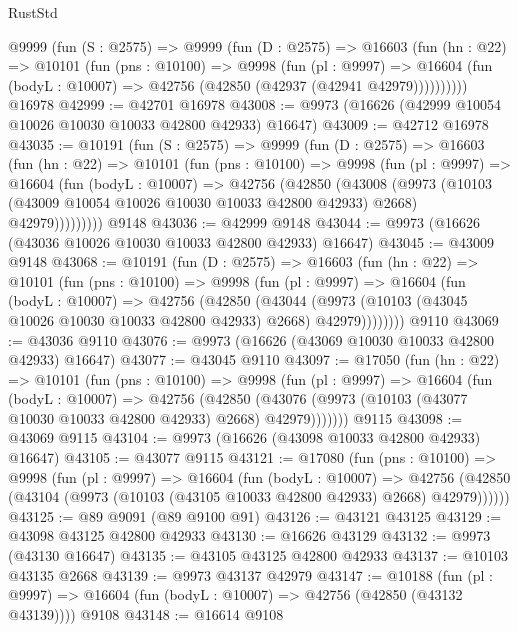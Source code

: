 \begin{lexlean}{RustStd}
\begin{coremodule}
    @9999
      (fun (S : @2575) =>
      @9999
        (fun (D : @2575) =>
        @16603
          (fun (hn : @22) =>
          @10101
            (fun (pns : @10100) =>
            @9998
              (fun (pl : @9997) =>
              @16604 (fun (bodyL : @10007) => @42756 (@42850 (@42937 (@42941 @42979))))))))))
    @16978
@42999 := @42701 @16978
@43008 := @9973 (@16626 (@42999 @10054 @10026 @10030 @10033 @42800 @42933) @16647)
@43009 := @42712 @16978
@43035 := @10191
    (fun (S : @2575) =>
    @9999
      (fun (D : @2575) =>
      @16603
        (fun (hn : @22) =>
        @10101
          (fun (pns : @10100) =>
          @9998
            (fun (pl : @9997) =>
            @16604
              (fun (bodyL : @10007) =>
              @42756
                (@42850
                  (@43008
                    (@9973
                      (@10103 (@43009 @10054 @10026 @10030 @10033 @42800 @42933) @2668)
                      @42979)))))))))
    @9148
@43036 := @42999 @9148
@43044 := @9973 (@16626 (@43036 @10026 @10030 @10033 @42800 @42933) @16647)
@43045 := @43009 @9148
@43068 := @10191
    (fun (D : @2575) =>
    @16603
      (fun (hn : @22) =>
      @10101
        (fun (pns : @10100) =>
        @9998
          (fun (pl : @9997) =>
          @16604
            (fun (bodyL : @10007) =>
            @42756
              (@42850
                (@43044
                  (@9973 (@10103 (@43045 @10026 @10030 @10033 @42800 @42933) @2668) @42979))))))))
    @9110
@43069 := @43036 @9110
@43076 := @9973 (@16626 (@43069 @10030 @10033 @42800 @42933) @16647)
@43077 := @43045 @9110
@43097 := @17050
    (fun (hn : @22) =>
    @10101
      (fun (pns : @10100) =>
      @9998
        (fun (pl : @9997) =>
        @16604
          (fun (bodyL : @10007) =>
          @42756
            (@42850 (@43076 (@9973 (@10103 (@43077 @10030 @10033 @42800 @42933) @2668) @42979)))))))
    @9115
@43098 := @43069 @9115
@43104 := @9973 (@16626 (@43098 @10033 @42800 @42933) @16647)
@43105 := @43077 @9115
@43121 := @17080
    (fun (pns : @10100) =>
    @9998
      (fun (pl : @9997) =>
      @16604
        (fun (bodyL : @10007) =>
        @42756 (@42850 (@43104 (@9973 (@10103 (@43105 @10033 @42800 @42933) @2668) @42979))))))
@43125 := @89 @9091 (@89 @9100 @91)
@43126 := @43121 @43125
@43129 := @43098 @43125 @42800 @42933
@43130 := @16626 @43129
@43132 := @9973 (@43130 @16647)
@43135 := @43105 @43125 @42800 @42933
@43137 := @10103 @43135 @2668
@43139 := @9973 @43137 @42979
@43147 := @10188
    (fun (pl : @9997) => @16604 (fun (bodyL : @10007) => @42756 (@42850 (@43132 @43139))))
    @9108
@43148 := @16614 @9108

\end{coremodule}
\end{lexlean}
